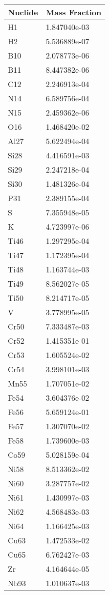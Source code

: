 \begin{centering}
\begin{longtable}[ht!]
{ p{} | p{} }
\hline
Nuclide & Mass Fraction\\
\hline
H1 & 1.847040e-03\\
H2 & 5.536889e-07\\
B10 & 2.078773e-06\\
B11 & 8.447382e-06\\
C12 & 2.246913e-04\\
N14 & 6.589756e-04\\
N15 & 2.459362e-06\\
O16 & 1.468420e-02\\
Al27 & 5.622494e-04\\
Si28 & 4.416591e-03\\
Si29 & 2.247218e-04\\
Si30 & 1.481326e-04\\
P31 & 2.389155e-04\\
S & 7.355948e-05\\
K & 4.723997e-06\\
Ti46 & 1.297295e-04\\
Ti47 & 1.172395e-04\\
Ti48 & 1.163744e-03\\
Ti49 & 8.562027e-05\\
Ti50 & 8.214717e-05\\
V & 3.778995e-05\\
Cr50 & 7.333487e-03\\
Cr52 & 1.415351e-01\\
Cr53 & 1.605524e-02\\
Cr54 & 3.998101e-03\\
Mn55 & 1.707051e-02\\
Fe54 & 3.604376e-02\\
Fe56 & 5.659124e-01\\
Fe57 & 1.307070e-02\\
Fe58 & 1.739600e-03\\
Co59 & 5.028159e-04\\
Ni58 & 8.513362e-02\\
Ni60 & 3.287757e-02\\
Ni61 & 1.430997e-03\\
Ni62 & 4.568483e-03\\
Ni64 & 1.166425e-03\\
Cu63 & 1.472533e-02\\
Cu65 & 6.762427e-03\\
Zr & 4.164644e-05\\
Nb93 & 1.010637e-03\\

\end{longtable}
\end{centering}
